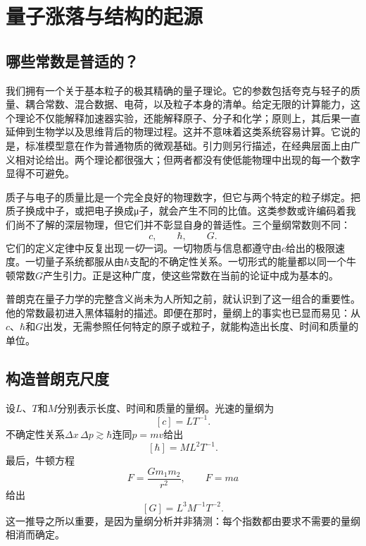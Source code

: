 \chapter{量子涨落与结构的起源}


\section{哪些常数是普适的？}

我们拥有一个关于基本粒子的极其精确的量子理论。它的参数包括夸克与轻子的质量、耦合常数、混合数据、电荷，以及粒子本身的清单。给定无限的计算能力，这个理论不仅能解释加速器实验，还能解释原子、分子和化学；原则上，其后果一直延伸到生物学以及思维背后的物理过程。这并不意味着这类系统容易计算。它说的是，标准模型意在作为普通物质的微观基础。引力则另行描述，在经典层面上由广义相对论给出。两个理论都很强大；但两者都没有使低能物理中出现的每一个数字显得不可避免。

质子与电子的质量比是一个完全良好的物理数字，但它与两个特定的粒子绑定。把质子换成中子，或把电子换成{\proseunicodefont μ}子，就会产生不同的比值。这类参数或许编码着我们尚不了解的深层物理，但它们并不彰显自身的普适性。三个量纲常数则不同：
\[
c,\qquad \hbar,\qquad G.
\]
它们的定义定律中反复出现\emph{一切}一词。一切物质与信息都遵守由\(c\)给出的极限速度。一切量子系统都服从由\(\hbar\)支配的不确定性关系。一切形式的能量都以同一个牛顿常数\(G\)产生引力。正是这种广度，使这些常数在当前的论证中成为基本的。

普朗克在量子力学的完整含义尚未为人所知之前，就认识到了这一组合的重要性。他的常数最初进入黑体辐射的描述。即便在那时，量纲上的事实也已显而易见：从\(c\)、\(\hbar\)和\(G\)出发，无需参照任何特定的原子或粒子，就能构造出长度、时间和质量的单位。

\section{构造普朗克尺度}

设\(L\)、\(T\)和\(M\)分别表示长度、时间和质量的量纲。光速的量纲为
\[
[c]=LT^{-1}.
\]
不确定性关系\(\Delta x\,\Delta p\gtrsim\hbar\)连同\(p=mv\)给出
\[
[\hbar]=ML^2T^{-1}.
\]
最后，牛顿方程
\[
F=\frac{Gm_1m_2}{r^2},
\qquad
F=ma
\]
给出
\[
[G]=L^3M^{-1}T^{-2}.
\]
这一推导之所以重要，是因为量纲分析并非猜测：每个指数都由要求不需要的量纲相消而确定。

